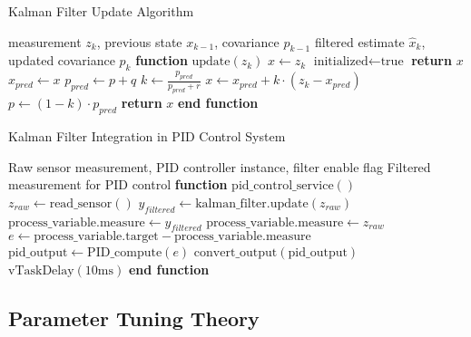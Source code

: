 \documentclass{article}
\begin{document}
\begin{algorithm}
\caption{Kalman Filter Update Algorithm}
\label{alg:kalman_update}
\begin{algorithmic}[1]
\REQUIRE measurement $z_k$, previous state $x_{k-1}$, covariance $p_{k-1}$
\ENSURE filtered estimate $\hat{x}_k$, updated covariance $p_k$
\STATE \textbf{function} $\text{update}(z_k)$
    \STATE $x \leftarrow z_k$ 
    \STATE $\text{initialized} \leftarrow \text{true}$
    \STATE \textbf{return} $x$
\ENDIF
\STATE
\STATE {}
\STATE $x_{pred} \leftarrow x$ 
\STATE $p_{pred} \leftarrow p + q$ 
\STATE
\STATE {}
\STATE $k \leftarrow \frac{p_{pred}}{p_{pred} + r}$ 
\STATE $x \leftarrow x_{pred} + k \cdot (z_k - x_{pred})$ 
\STATE $p \leftarrow (1 - k) \cdot p_{pred}$ 
\STATE
\STATE \textbf{return} $x$
\STATE \textbf{end function}
\end{algorithmic}
\end{algorithm}

\begin{algorithm}
\caption{Kalman Filter Integration in PID Control System}
\label{alg:kalman_pid_integration}
\begin{algorithmic}[1]
\REQUIRE Raw sensor measurement, PID controller instance, filter enable flag
\ENSURE Filtered measurement for PID control
\STATE \textbf{function} $\text{pid\_control\_service}()$
    \STATE $z_{raw} \leftarrow \text{read\_sensor}()$ 
        \STATE $y_{filtered} \leftarrow \text{kalman\_filter.update}(z_{raw})$
        \STATE $\text{process\_variable.measure} \leftarrow y_{filtered}$
    \ELSE
        \STATE $\text{process\_variable.measure} \leftarrow z_{raw}$
    \ENDIF
    \STATE
    \STATE $e \leftarrow \text{process\_variable.target} - \text{process\_variable.measure}$
    \STATE $\text{pid\_output} \leftarrow \text{PID\_compute}(e)$
    \STATE $\text{convert\_output}(\text{pid\_output})$ 
    \STATE $\text{vTaskDelay}(10\text{ms})$ 
\ENDWHILE
\STATE \textbf{end function}
\end{algorithmic}
\end{algorithm}

\subsection{Parameter Tuning Theory}
\end{document}
